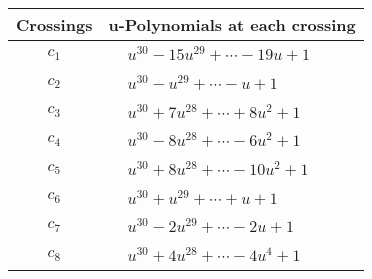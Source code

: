 \documentclass[1p]{elsarticle_modified}
\theoremstyle{definition}
\begin{document}
\begin{tabular}{m{50pt}|m{274pt}}
Crossings & \hspace{64pt}u-Polynomials at each crossing \\
\hline $$\begin{aligned}c_{1}\end{aligned}$$&$\begin{aligned}
&u^{30}-15 u^{29}+\cdots-19 u+1
\end{aligned}$\\
\hline $$\begin{aligned}c_{2}\end{aligned}$$&$\begin{aligned}
&u^{30}- u^{29}+\cdots- u+1
\end{aligned}$\\
\hline $$\begin{aligned}c_{3}\end{aligned}$$&$\begin{aligned}
&u^{30}+7 u^{28}+\cdots+8 u^2+1
\end{aligned}$\\
\hline $$\begin{aligned}c_{4}\end{aligned}$$&$\begin{aligned}
&u^{30}-8 u^{28}+\cdots-6 u^2+1
\end{aligned}$\\
\hline $$\begin{aligned}c_{5}\end{aligned}$$&$\begin{aligned}
&u^{30}+8 u^{28}+\cdots-10 u^2+1
\end{aligned}$\\
\hline $$\begin{aligned}c_{6}\end{aligned}$$&$\begin{aligned}
&u^{30}+u^{29}+\cdots+u+1
\end{aligned}$\\
\hline $$\begin{aligned}c_{7}\end{aligned}$$&$\begin{aligned}
&u^{30}-2 u^{29}+\cdots-2 u+1
\end{aligned}$\\
\hline $$\begin{aligned}c_{8}\end{aligned}$$&$\begin{aligned}
&u^{30}+4 u^{28}+\cdots-4 u^4+1
\end{aligned}$\\

\end{tabular}
\end{document}
